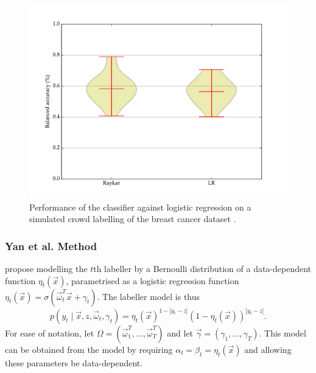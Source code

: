             \begin{figure}[!ht]
                \centering
                \includegraphics[width=\textwidth]{images/experiments/raykar.pdf}
                \caption{Performance of the \citeauthor{raykar10} classifier against logistic regression on a simulated crowd labelling of the breast cancer dataset \citep{wolberg90}.}
                \label{fig:raykar}
            \end{figure}

        \subsubsection{Yan et al. Method}

            \citet{yan10} propose modelling the $t$th labeller by a Bernoulli distribution of a data-dependent function $\eta_t(\vec x)$, parametrised as a logistic regression function $\eta_t(\vec x) = \sigma(\vec \omega_t^T \vec x + \gamma_t)$. The labeller model is thus
            \begin{equation*}
                p(y_t \mid \vec x, z, \vec \omega_t, \gamma_t) = \eta_t(\vec x)^{1 - |y_t - z|} (1 - \eta_t(\vec x))^{|y_t - z|}.
            \end{equation*}
            For ease of notation, let $\Omega = (\vec \omega_1^T, \dots, \vec \omega_T^T)$ and let $\vec \gamma = (\gamma_1, \dots, \gamma_T)$. This model can be obtained from the \citeauthor{raykar10} model by requiring $\alpha_t = \beta_t = \eta_t(\vec x)$ and allowing these parameters be data-dependent.

